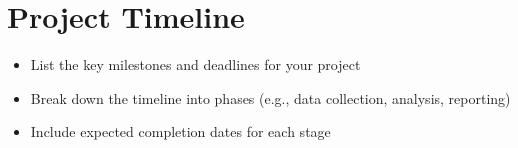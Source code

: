 \documentclass{article}
\begin{document}
\section*{Project Timeline}
\begin{itemize}
    \item List the key milestones and deadlines for your project
    \item Break down the timeline into phases (e.g., data collection, analysis, reporting)
    \item Include expected completion dates for each stage
\end{itemize}




\end{document}
